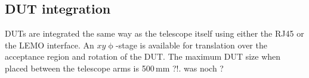 \subsection{DUT integration}

DUTs are integrated the same way as the telescope itself using either the RJ45 or the LEMO interface. 
An $xy\upphi$-stage is available for translation over the acceptance region and rotation of the DUT. 
The maximum DUT size when placed between the telescope arms is 500\,mm ?!.
was noch ?
